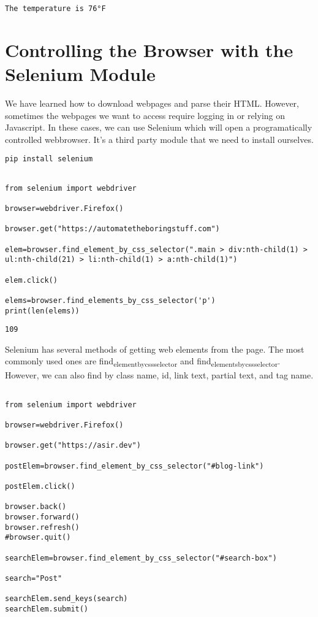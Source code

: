 \documentclass[11pt]{article}
\begin{document}
\begin{verbatim}
The temperature is 76°F
\end{verbatim}
\section{Controlling the Browser with the Selenium Module}
\label{sec:orgf2b6837}

We have learned how to download webpages and parse their HTML. However, sometimes the webpages we want to access require logging in or relying on Javascript. In these cases, we can use Selenium which will open a programatically controlled webbrowser. It's a third party module that we need to install ourselves.

\begin{verbatim}
pip install selenium
\end{verbatim}

\begin{verbatim}

from selenium import webdriver

browser=webdriver.Firefox()

browser.get("https://automatetheboringstuff.com")

elem=browser.find_element_by_css_selector(".main > div:nth-child(1) > ul:nth-child(21) > li:nth-child(1) > a:nth-child(1)")

elem.click()

elems=browser.find_elements_by_css_selector('p')
print(len(elems))

\end{verbatim}

\begin{verbatim}
109
\end{verbatim}


Selenium has several methods of getting web elements from the page. The most commonly used ones are find\textsubscript{element}\textsubscript{by}\textsubscript{css}\textsubscript{selector} and find\textsubscript{elements}\textsubscript{by}\textsubscript{css}\textsubscript{selector}. However, we can also find by class name, id, link text, partial text, and tag name.

\begin{verbatim}

from selenium import webdriver

browser=webdriver.Firefox()

browser.get("https://asir.dev")

postElem=browser.find_element_by_css_selector("#blog-link")

postElem.click()

browser.back()
browser.forward()
browser.refresh()
#browser.quit()

searchElem=browser.find_element_by_css_selector("#search-box")

search="Post"

searchElem.send_keys(search)
searchElem.submit()

\end{verbatim}
\end{document}
